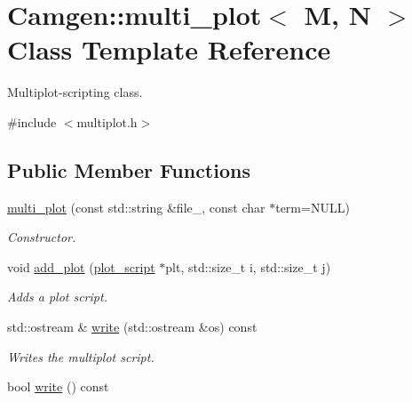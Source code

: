 \hypertarget{a00380}{}\section{Camgen\+:\+:multi\+\_\+plot$<$ M, N $>$ Class Template Reference}
\label{a00380}


Multiplot-\/scripting class.  




{\ttfamily \#include $<$multiplot.\+h$>$}

\subsection*{Public Member Functions}
\begin{DoxyCompactItemize}
\item 
\hypertarget{a00380_aef053c10f5955934be8792fe0d5db63a}{}\hyperlink{a00380_aef053c10f5955934be8792fe0d5db63a}{multi\+\_\+plot} (const std\+::string \&file\+\_\+, const char $\ast$term=N\+U\+L\+L)\label{a00380_aef053c10f5955934be8792fe0d5db63a}

\begin{DoxyCompactList}\small\item\em Constructor. \end{DoxyCompactList}\item 
\hypertarget{a00380_a30977af8adb7db607839b4183c13e191}{}void \hyperlink{a00380_a30977af8adb7db607839b4183c13e191}{add\+\_\+plot} (\hyperlink{a00431}{plot\+\_\+script} $\ast$plt, std\+::size\+\_\+t i, std\+::size\+\_\+t j)\label{a00380_a30977af8adb7db607839b4183c13e191}

\begin{DoxyCompactList}\small\item\em Adds a plot script. \end{DoxyCompactList}\item 
\hypertarget{a00380_a1b2f538de3ee1a5334c34379999f905f}{}std\+::ostream \& \hyperlink{a00380_a1b2f538de3ee1a5334c34379999f905f}{write} (std\+::ostream \&os) const \label{a00380_a1b2f538de3ee1a5334c34379999f905f}

\begin{DoxyCompactList}\small\item\em Writes the multiplot script. \end{DoxyCompactList}\item 
\hypertarget{a00380_a12255f3c1213be24e44b711f5bd75a2e}{}bool \hyperlink{a00380_a12255f3c1213be24e44b711f5bd75a2e}{write} () const \label{a00380_a12255f3c1213be24e44b711f5bd75a2e}


\end{DoxyCompactItemize}
